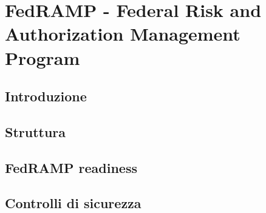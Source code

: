 \documentclass[../main.tex]{subfiles}
\begin{document}
\chapter{FedRAMP - Federal Risk and Authorization Management Program}
\section{Introduzione}
\section{Struttura}
\section{FedRAMP readiness}
\section{Controlli di sicurezza}
\end{document}
